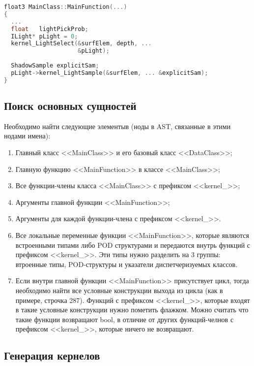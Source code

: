 \documentclass[a4paper,12pt]{article}
\begin{document}
\begin{lstlisting}[language=C++, caption=Пример диспетчиризуемого класса ILight с виртуальными функциями., captionpos=b, label=lightexample]
float3 MainClass::MainFunction(...)
{
  ...
  float   lightPickProb;
  ILight* pLight = 0;
  kernel_LightSelect(&surfElem, depth, ...
                     &pLight);
  
  ShadowSample explicitSam;
  pLight->kernel_LightSample(&surfElem, ... &explicitSam);
}
\end{lstlisting}


\subsection{Поиск основных сущностей}

Необходимо найти следующие элементыв (ноды в AST, связанные в этими нодами имена):

\begin{enumerate}
\item Главный класс <<MainClass>> и его базовый класс <<DataClass>>;
\item Главную функцию <<MainFunction>> в классе <<MainClass>>;
\item Все функции-члены класса <<MainClass>> с префиксом <<kernel\_>>;
\item Аргументы главной функции <<MainFunction>>;
\item Аргументы для каждой функции-члена с префиксом <<kernel\_>>.

\item Все локальные переменные функции <<MainFunction>>, которые являются встроенными типами либо POD структурами и передаются внутрь функций  с префиксом <<kernel\_>>. Эти типы нужно разделить на 3 группы: втроенные типы, POD-структуры и указатели диспетчеризуемых классов.

\item Если внутри главной функции <<MainFunction>> присутствует цикл, тогда необходимо найти все условные конструкции выхода из цикла (как в примере, строчка 287). Функций с префиксом <<kernel\_>>, которые входят в такие условные конструкции нужно пометить флажком. Можно считать что такие функции возвращают bool, в отличие от других функций-челнов с префиксом <<kernel\_>>, которые ничего не возвращают.

\end{enumerate}

\subsection{Генерация кернелов}
\end{document}
